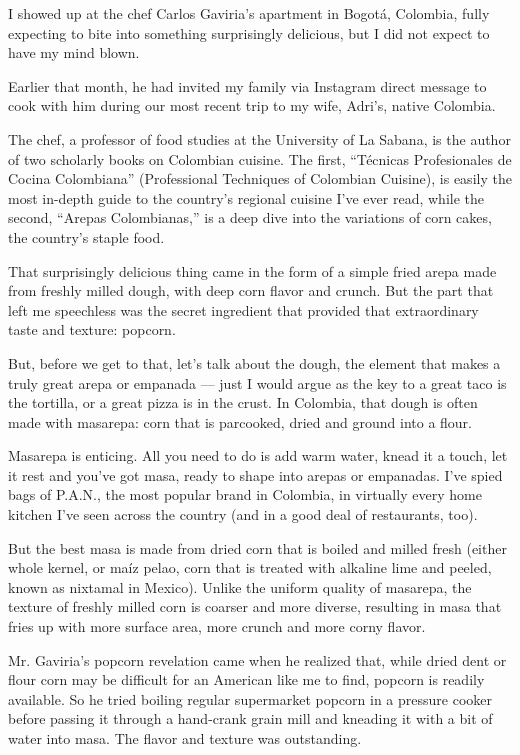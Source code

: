 I showed up at the chef Carlos Gaviria's apartment in Bogotá, Colombia,
fully expecting to bite into something surprisingly delicious, but I did
not expect to have my mind blown.

Earlier that month, he had invited my family via Instagram direct
message to cook with him during our most recent trip to my wife, Adri's,
native Colombia.

The chef, a professor of food studies at the University of La Sabana, is
the author of two scholarly books on Colombian cuisine. The first,
``Técnicas Profesionales de Cocina Colombiana'' (Professional Techniques
of Colombian Cuisine), is easily the most in-depth guide to the
country's regional cuisine I've ever read, while the second, ``Arepas
Colombianas,'' is a deep dive into the variations of corn cakes, the
country's staple food.

That surprisingly delicious thing came in the form of a simple fried
arepa made from freshly milled dough, with deep corn flavor and crunch.
But the part that left me speechless was the secret ingredient that
provided that extraordinary taste and texture: popcorn.

But, before we get to that, let's talk about the dough, the element that
makes a truly great arepa or empanada --- just I would argue as the key
to a great taco is the tortilla, or a great pizza is in the crust. In
Colombia, that dough is often made with masarepa: corn that is
parcooked, dried and ground into a flour.

Masarepa is enticing. All you need to do is add warm water, knead it a
touch, let it rest and you've got masa, ready to shape into arepas or
empanadas. I've spied bags of P.A.N., the most popular brand in
Colombia, in virtually every home kitchen I've seen across the country
(and in a good deal of restaurants, too).

But the best masa is made from dried corn that is boiled and milled
fresh (either whole kernel, or maíz pelao, corn that is treated with
alkaline lime and peeled, known as nixtamal in Mexico). Unlike the
uniform quality of masarepa, the texture of freshly milled corn is
coarser and more diverse, resulting in masa that fries up with more
surface area, more crunch and more corny flavor.

Mr. Gaviria's popcorn revelation came when he realized that, while dried
dent or flour corn may be difficult for an American like me to find,
popcorn is readily available. So he tried boiling regular supermarket
popcorn in a pressure cooker before passing it through a hand-crank
grain mill and kneading it with a bit of water into masa. The flavor and
texture was outstanding.

